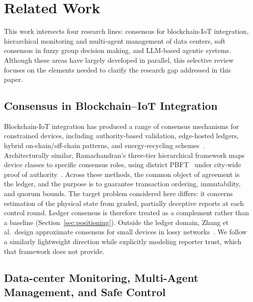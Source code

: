 \documentclass[smartcities,article,submit,moreauthors]{Definitions/mdpi}
\begin{document}
\section{Related Work}
\label{sec:related}

This work intersects four research lines: consensus for blockchain-IoT
integration, hierarchical monitoring and multi-agent management of data
centers, soft consensus in fuzzy group decision making, and LLM-based
agentic systems. Although these areas have largely developed in parallel,
this selective review focuses on the elements needed to clarify the
research gap addressed in this paper.

\subsection{Consensus in Blockchain--IoT Integration}
\label{sec:related_blockchain}

Blockchain-IoT integration has produced a range of consensus mechanisms
for constrained devices, including authority-based validation,
edge-hosted ledgers, hybrid on-chain/off-chain patterns, and
energy-recycling schemes~\cite{khan2018,reyna2018,novo2018,
pan2019edgechain,tuli2019fogbus,qu2021pofl,haque2024}. Architecturally
similar, Ramachandran's three-tier hierarchical framework maps device
classes to specific consensus roles, using district
PBFT~\cite{castro1999} under city-wide proof of
authority~\cite{ramachandran2026}. Across these methods, the common object
of agreement is the ledger, and the purpose is to guarantee transaction
ordering, immutability, and quorum bounds. The target problem considered
here differs: it concerns estimation of the physical state from graded,
partially deceptive reports at each control round. Ledger consensus is
therefore treated as a complement rather than a baseline
(Section~\ref{sec:positioning}). Outside the ledger domain, Zhang et al.\
design approximate consensus for small devices in lossy
networks~\cite{zhang2021approx}. We follow a similarly lightweight
direction while explicitly modeling reporter trust, which that framework
does not provide.

\subsection{Data-center Monitoring, Multi-Agent Management, and Safe
Control}
\label{sec:related_dc}
\end{document}
